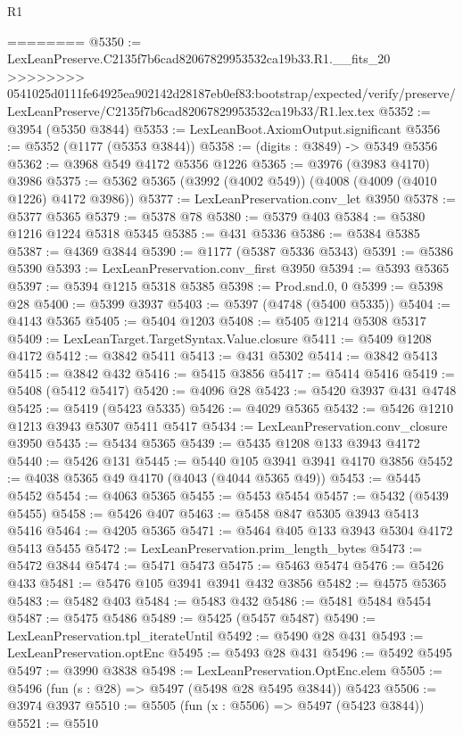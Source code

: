\begin{lexlean}{R1}
\begin{coremodule}
{{{{{{{{{{{{{{{{{{{{{{{{{{{{{{{{{{{{{{{{{{{{{{{{{{{{{{{{{{{{{{{{{{{{{{{{{{{{{{{{{{{{{{{{{{{{{{{{{{{{{{{{{{{{{{{{{{{{{{{{{{{{{{{{{{{{{{{{{{{{{{{{{{{{{{{{{{{{{{{{{{{{{{{{{{{{{{{{{{{{{{{{{{========
@5350 := LexLeanPreserve.C2135f7b6cad82067829953532ca19b33.R1.__fits_20
>>>>>>>> 0541025d0111fe64925ea902142d28187eb0ef83:bootstrap/expected/verify/preserve/LexLeanPreserve/C2135f7b6cad82067829953532ca19b33/R1.lex.tex
@5352 := @3954 (@5350 @3844)
@5353 := LexLeanBoot.AxiomOutput.significant
@5356 := @5352 (@1177 (@5353 @3844))
@5358 := (digits : @3849) -> @5349 @5356
@5362 := @3968 @549 @4172 @5356 @1226
@5365 := @3976 (@3983 @4170) @3986
@5375 := @5362 @5365 (@3992 (@4002 @549)) (@4008 (@4009 (@4010 @1226) @4172 @3986))
@5377 := LexLeanPreservation.conv_let @3950
@5378 := @5377 @5365
@5379 := @5378 @78
@5380 := @5379 @403
@5384 := @5380 @1216 @1224 @5318 @5345
@5385 := @431 @5336
@5386 := @5384 @5385
@5387 := @4369 @3844
@5390 := @1177 (@5387 @5336 @5343)
@5391 := @5386 @5390
@5393 := LexLeanPreservation.conv_first @3950
@5394 := @5393 @5365
@5397 := @5394 @1215 @5318 @5385
@5398 := Prod.snd.{0, 0}
@5399 := @5398 @28
@5400 := @5399 @3937
@5403 := @5397 (@4748 (@5400 @5335))
@5404 := @4143 @5365
@5405 := @5404 @1203
@5408 := @5405 @1214 @5308 @5317
@5409 := LexLeanTarget.TargetSyntax.Value.closure
@5411 := @5409 @1208 @4172
@5412 := @3842 @5411
@5413 := @431 @5302
@5414 := @3842 @5413
@5415 := @3842 @432
@5416 := @5415 @3856
@5417 := @5414 @5416
@5419 := @5408 (@5412 @5417)
@5420 := @4096 @28
@5423 := @5420 @3937 @431 @4748
@5425 := @5419 (@5423 @5335)
@5426 := @4029 @5365
@5432 := @5426 @1210 @1213 @3943 @5307 @5411 @5417
@5434 := LexLeanPreservation.conv_closure @3950
@5435 := @5434 @5365
@5439 := @5435 @1208 @133 @3943 @4172
@5440 := @5426 @131
@5445 := @5440 @105 @3941 @3941 @4170 @3856
@5452 := @4038 @5365 @49 @4170 (@4043 (@4044 @5365 @49))
@5453 := @5445 @5452
@5454 := @4063 @5365
@5455 := @5453 @5454
@5457 := @5432 (@5439 @5455)
@5458 := @5426 @407
@5463 := @5458 @847 @5305 @3943 @5413 @5416
@5464 := @4205 @5365
@5471 := @5464 @405 @133 @3943 @5304 @4172 @5413 @5455
@5472 := LexLeanPreservation.prim_length_bytes
@5473 := @5472 @3844
@5474 := @5471 @5473
@5475 := @5463 @5474
@5476 := @5426 @433
@5481 := @5476 @105 @3941 @3941 @432 @3856
@5482 := @4575 @5365
@5483 := @5482 @403
@5484 := @5483 @432
@5486 := @5481 @5484 @5454
@5487 := @5475 @5486
@5489 := @5425 (@5457 @5487)
@5490 := LexLeanPreservation.tpl_iterateUntil
@5492 := @5490 @28 @431
@5493 := LexLeanPreservation.optEnc
@5495 := @5493 @28 @431
@5496 := @5492 @5495
@5497 := @3990 @3838
@5498 := LexLeanPreservation.OptEnc.elem
@5505 := @5496 (fun (s : @28) => @5497 (@5498 @28 @5495 @3844)) @5423
@5506 := @3974 @3937
@5510 := @5505 (fun (x : @5506) => @5497 (@5423 @3844))
@5521 := @5510
}}}}}}}}}}}}}}}}}}}}}}}}}}}}}}}}}}}}}}}}}}}}}}}}}}}}}}}}}}}}}}}}}}}}}}}}}}}}}}}}}}}}}}}}}}}}}}}}}}}}}}}}}}}}}}}}}}}}}}}}}}}}}}}}}}}}}}}}}}}}}}}}}}}}}}}}}}}}}}}}}}}}}}}}}}}}}}}}}}}}}}}}}}
\end{coremodule}
\end{lexlean}
